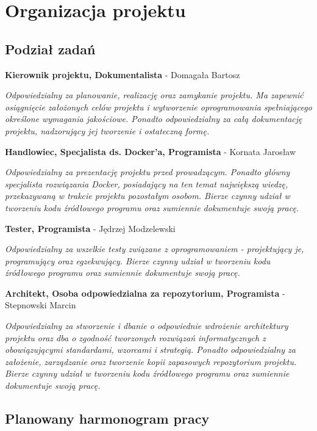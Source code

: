 \chapter{Organizacja projektu}
\section{Podział zadań}

\par{\textbf{Kierownik projektu, Dokumentalista} - Domagała Bartosz

\textit{Odpowiedzialny za planowanie, realizację oraz zamykanie projektu. Ma zapewnić osiągnięcie założonych celów projektu i wytworzenie oprogramowania spełniającego określone wymagania jakościowe. Ponadto odpowiedzialny za całą dokumentację projektu, nadzorujący jej tworzenie i ostateczną formę.}}

\par{\textbf{Handlowiec, Specjalista ds. Docker'a, Programista} - Kornata Jarosław}
\par{\textit{Odpowiedzialny za prezentację projektu przed prowadzącym. Ponadto główny specjalista rozwiązania Docker, posiadający na ten temat największą wiedzę, przekazywaną w trakcie projektu pozostałym osobom. Bierze czynny udział w tworzeniu kodu źródłowego programu oraz sumiennie dokumentuje swoją pracę.}}


\par{\textbf{Tester, Programista} - Jędrzej Modzelewski}
\par{\textit{Odpowiedzialny za wszelkie testy związane z oprogramowaniem - projektujący je, programujący oraz egzekwujący. Bierze czynny udział w tworzeniu kodu źródłowego programu oraz sumiennie dokumentuje swoją pracę.}}

\par{\textbf{Architekt, Osoba odpowiedzialna za repozytorium, Programista} - Stepnowski Marcin}
\par{\textit{Odpowiedzialny za stworzenie i dbanie o odpowiednie wdrożenie architektury projektu oraz dba o zgodność tworzonych rozwiązań informatycznych z obowiązującymi standardami, wzorcami i strategią. Ponadto odpowiedzialny za założenie, zarządzanie oraz tworzenie kopii zapasowych repozytorium projektu. Bierze czynny udział w tworzeniu kodu źródłowego programu oraz sumiennie dokumentuje swoją pracę.}}


\section{Planowany harmonogram pracy}

